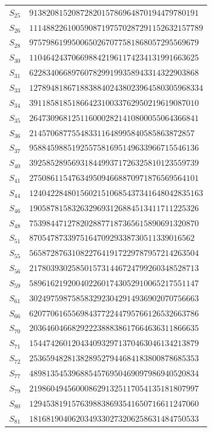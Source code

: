 \documentclass[12pt,a4paper]{article}
\numberwithin{equation}{section}
\theoremstyle{definition}
\begin{document}
{\begin{longtable}{rl}
$S_{25}$ & $9138208152087282015786964870194479780191$\\
$S_{26}$ & $11148822610059087197570287291152632157789$\\
$S_{28}$ & $9757986199500650267077581868057295569679$\\
$S_{30}$ & $1104642437066988421961174234131991663625$\\
$S_{31}$ & $6228340668976078299199358943314322903868$\\
$S_{33}$ & $12789481867188388402438023964580305968334$\\
$S_{34}$ & $3911858185186642310033762950219619087010$\\
$S_{35}$ & $2647309681251160002821410800055064366841$\\
$S_{36}$ & $214570687755483311648995840585863872857$\\
$S_{37}$ & $9588459885192557581695149633966715546136$\\
$S_{40}$ & $3925852895693184499371726325810123559739$\\
$S_{41}$ & $2750861154763495094668870971876569564101$\\
$S_{44}$ & $12404228480156021510685437341648042835163$\\
$S_{46}$ & $1905878158326329693126884513411711225326$\\
$S_{48}$ & $7539844712782028877187365615890691320870$\\
$S_{51}$ & $870547873397516470929338730511339016562$\\
$S_{55}$ & $5658728763108227641917229787957214263504$\\
$S_{56}$ & $2178039302585015731446724799260348528713$\\
$S_{59}$ & $5896162192004022601743052910065217551147$\\
$S_{61}$ & $3024975987585832923042914936902070756663$\\
$S_{66}$ & $6207706165569843772244795766126532663786$\\
$S_{70}$ & $2036460466829222388838617664636311866635$\\
$S_{71}$ & $1544742601204340932971370463046134213879$\\
$S_{72}$ & $2536594828138289527944684183800878685353$\\
$S_{77}$ & $4898135453968854576950469097986940520834$\\
$S_{79}$ & $2198604945600086291325117054135181807997$\\
$S_{80}$ & $1294538191576398838693541650716611247060$\\
$S_{81}$ & $1816819040620349330273206258631484750533$\\

\end{longtable}}
\end{document}
